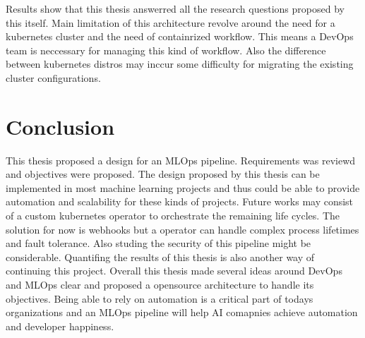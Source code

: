 \documentclass[a4paper, 10pt]{article}
\theoremstyle{nonumberplain}
\begin{document}
Results show that this thesis answerred all the research questions proposed by
this itself.
Main limitation of this architecture revolve around the need for a kubernetes
cluster and the need of containrized workflow. This means a DevOps team
is neccessary for managing this kind of workflow. Also the difference between
kubernetes distros may inccur some difficulty for migrating the existing
cluster configurations.

\section{Conclusion}
This thesis proposed a design for an MLOps pipeline. Requirements was reviewd
and objectives were proposed. The design proposed by this thesis
can be implemented in most machine learning projects and thus could be able to
provide automation and scalability for these kinds of projects.
Future works may consist of a custom kubernetes operator to orchestrate
the remaining life cycles. The solution for now is webhooks but a operator
can handle complex process lifetimes and fault tolerance. Also studing the
security of this pipeline might be considerable. Quantifing the results of
this thesis is also another way of continuing this project.
Overall this thesis made several ideas around DevOps and MLOps clear and
proposed a opensource architecture to handle its objectives.
Being able to rely on automation is a critical part of todays organizations
and an MLOps pipeline will help AI comapnies achieve automation and developer
happiness.



% 
\end{document}
